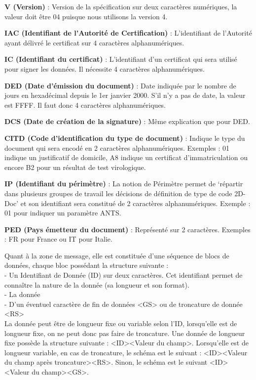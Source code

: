 \textbf{V (Version)} : 
Version de la spécification sur deux caractères numériques, la valeur doit être 04 puisque nous utilisons la version 4.

\textbf{IAC (Identifiant de l'Autorité de Certification)} :
L'identifiant de l'Autorité ayant délivré le certificat sur 4 caractères alphanumériques.

\textbf{IC (Identifiant du certificat)} : 
L'identifiant d'un certificat qui sera utilisé pour signer les données. Il nécessite 4 caractères alphanumériques.

\textbf{DED (Date d’émission du document)} :
Date indiquée par le nombre de jours en hexadécimal depuis le 1er janvier 2000. S’il n’y a pas de date, la valeur est FFFF. Il faut donc 4 caractères alphanumériques.


\textbf{DCS (Date de création de la signature)} : 
Même explication que pour DED.

\textbf{CITD (Code d’identification du type de document)} :
Indique le type du document qui sera encodé en 2 caractères alphanumériques. Exemples : 01 indique un justificatif de domicile, A8 indique un certificat d’immatriculation ou encore B2 pour un résultat de test virologique. 

\textbf{IP (Identifiant du périmètre)} :
La notion de Périmètre permet de ‘répartir dans plusieurs groupes de travail les décisions de définition de type de code 2D-Doc’ et son identifiant sera constitué de 2 caractères alphanumériques. Exemple : 01 pour indiquer un paramètre ANTS.

\textbf{PED (Pays émetteur du document)} :
Représenté sur 2 caractères. Exemples : FR pour France ou IT pour Italie.

Quant à la zone de message, elle est constituée d’une séquence de blocs de données, chaque bloc possédant la structure suivante : \\
\newline
- Un Identifiant de Donnée (ID) sur deux caractères. Cet identifiant permet de connaître la nature de la donnée (sa longueur et son format). \\
- La donnée \\
- D’un éventuel caractère de fin de données <GS> ou de troncature de donnée <RS> \\

La donnée peut être de longueur fixe ou variable selon l'ID, lorsqu’elle est de longueur fixe, on ne peut donc pas faire de troncature. Une donnée de longueur fixe possède la structure suivante : <ID><Valeur du champ>. Lorsqu'elle est de longueur variable, en cas de troncature, le schéma est le suivant : <ID><Valeur du champ après troncature><RS>.
Sinon, le schéma est le suivant <ID><Valeur du champ><GS>.

